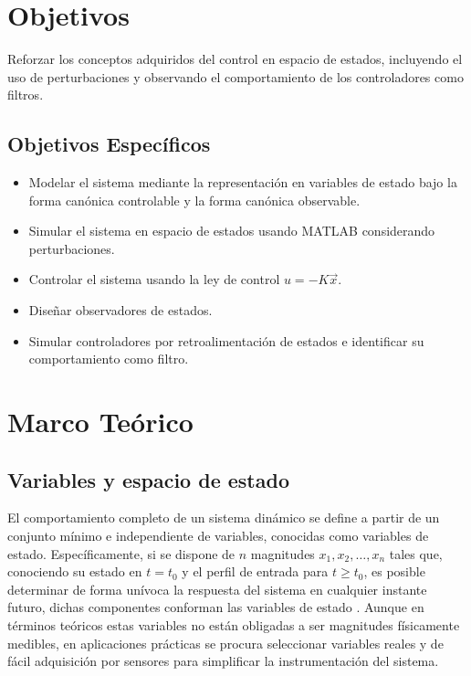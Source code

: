 \documentclass[conference]{IEEEtran}
\begin{document}
\section{Objetivos}

Reforzar los conceptos adquiridos del control en espacio de estados, incluyendo el uso de perturbaciones y observando el comportamiento de los controladores como filtros.

\subsection*{Objetivos Específicos}
\begin{itemize}
    \item Modelar el sistema mediante la representación en variables de estado bajo la forma canónica controlable y la forma canónica observable.
    \item Simular el sistema en espacio de estados usando MATLAB considerando perturbaciones.
    \item Controlar el sistema usando la ley de control $u=-K\vec{x}$.
    \item Diseñar observadores de estados.
    \item Simular controladores por retroalimentación de estados e identificar su comportamiento como filtro.
\end{itemize}

\section{Marco Teórico}

\subsection*{Variables y espacio de estado}
El comportamiento completo de un sistema dinámico se define a partir de un conjunto mínimo e independiente de variables, conocidas como variables de estado. Específicamente, si se dispone de $n$ magnitudes $x_1,x_2,\dots,x_n$ tales que, conociendo su estado en $t=t_0$ y el perfil de entrada para $t\geq t_0$, es posible determinar de forma unívoca la respuesta del sistema en cualquier instante futuro, dichas componentes conforman las variables de estado \cite{ogata_discreto}. Aunque en términos teóricos estas variables no están obligadas a ser magnitudes físicamente medibles, en aplicaciones prácticas se procura seleccionar variables reales y de fácil adquisición por sensores para simplificar la instrumentación del sistema.
\end{document}
